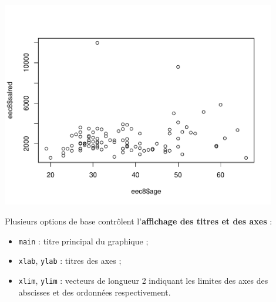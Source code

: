 \documentclass[12pt,twosided, notitlepage]{book}
\newenvironment{Shaded}{}{}
\newcommand{\CommentTok}[1]{\textcolor[rgb]{0.00,0.50,0.00}{#1}}
\newcommand{\DecValTok}[1]{#1}
\newcommand{\KeywordTok}[1]{\textcolor[rgb]{0.00,0.00,1.00}{#1}}
\newcommand{\NormalTok}[1]{#1}
\newcommand{\OperatorTok}[1]{#1}
\newcommand{\StringTok}[1]{\textcolor[rgb]{0.00,0.50,0.50}{#1}}
\providecommand{\tightlist}{%
  \setlength{\itemsep}{0pt}\setlength{\parskip}{0pt}}
\renewenvironment{Shaded}{\begin{snugshade}}{\end{snugshade}}
\begin{document}
\begin{Shaded}
\end{Shaded}

\begin{center}\includegraphics[width=12cm]{livret_files/figure-latex/unnamed-chunk-435-1} \end{center}

Plusieurs options de base contrôlent l'\textbf{affichage des titres et
des axes} :

\begin{itemize}
\tightlist
\item
  \texttt{main} : titre principal du graphique ;
\item
  \texttt{xlab}, \texttt{ylab} : titres des axes ;
\item
  \texttt{xlim}, \texttt{ylim} : vecteurs de longueur 2 indiquant les
  limites des axes des abscisses et des ordonnées respectivement.
\end{itemize}
\end{document}
